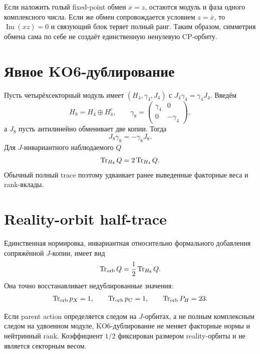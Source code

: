 Если наложить голый fixed-point обмен \(x=z\), остаются модуль и фаза
одного комплексного числа. Если же обмен сопровождается условием
\(z=\overline x\), то \(\operatorname{Im}(xz)=0\) и связующий блок теряет
полный ранг. Таким образом, симметрия обмена сама по себе не создаёт
единственную ненулевую CP-орбиту.

\section{Явное KO6-дублирование}

Пусть четырёхсекторный модуль имеет \((H_4,\gamma_4,J_4)\) с
\(J_4\gamma_4=\gamma_4J_4\). Введём
\begin{equation}
 H_8=H_4\oplus H_4^{c},
 \qquad
 \gamma_8=
 \begin{pmatrix}
 \gamma_4&0\\0&-\gamma_4
 \end{pmatrix},
\end{equation}
а \(J_8\) пусть антилинейно обменивает две копии. Тогда
\begin{equation}
 J_8\gamma_8=-\gamma_8J_8.
\end{equation}
Для \(J\)-инвариантного наблюдаемого \(Q\)
\begin{equation}
 \operatorname{Tr}_{H_8}Q=2\operatorname{Tr}_{H_4}Q.
\end{equation}
Обычный полный trace поэтому удваивает ранее выведенные факторные веса и
rank-вклады.

\section{Reality-orbit half-trace}

Единственная нормировка, инвариантная относительно формального добавления
сопряжённой \(J\)-копии, имеет вид
\begin{equation}
 \operatorname{Tr}_{\mathrm{orb}}Q
 =\frac12\operatorname{Tr}_{H_8}Q.
\end{equation}
Она точно восстанавливает недублированные значения:
\begin{equation}
 \operatorname{Tr}_{\mathrm{orb}}p_X=1,
 \qquad
 \operatorname{Tr}_{\mathrm{orb}}p_C=1,
 \qquad
 \operatorname{Tr}_{\mathrm{orb}}P_H=23.
\end{equation}

\begin{proposition}
Если parent action определяется следом на \(J\)-орбитах, а не полным
комплексным следом на удвоенном модуле, KO6-дублирование не меняет
факторные нормы и нейтринный rank. Коэффициент \(1/2\) фиксирован размером
reality-орбиты и не является секторным весом.
\end{proposition}

